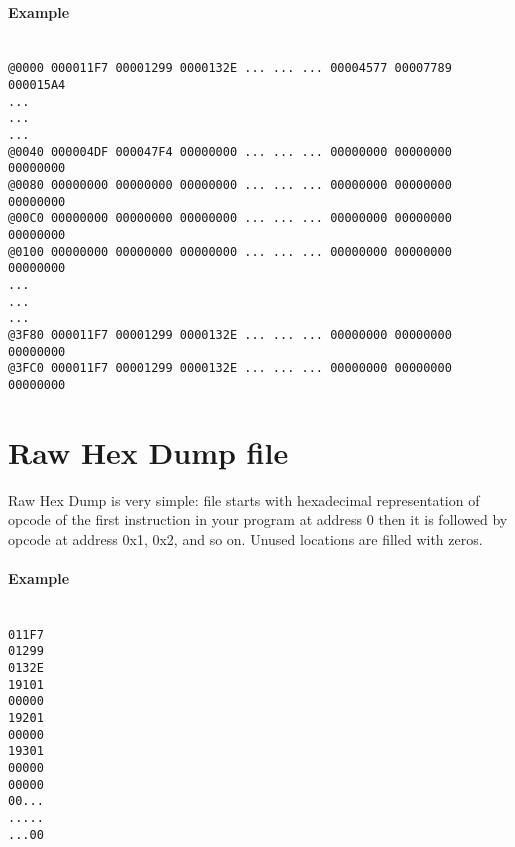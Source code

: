     \paragraph{Example}
        ~\\
        \verb'@0000 000011F7 00001299 0000132E ... ... ... 00004577 00007789 000015A4'\\
        \verb'...'\\
        \verb'...'\\
        \verb'...'\\
        \verb'@0040 000004DF 000047F4 00000000 ... ... ... 00000000 00000000 00000000'\\
        \verb'@0080 00000000 00000000 00000000 ... ... ... 00000000 00000000 00000000'\\
        \verb'@00C0 00000000 00000000 00000000 ... ... ... 00000000 00000000 00000000'\\
        \verb'@0100 00000000 00000000 00000000 ... ... ... 00000000 00000000 00000000'\\
        \verb'...'\\
        \verb'...'\\
        \verb'...'\\
        \verb'@3F80 000011F7 00001299 0000132E ... ... ... 00000000 00000000 00000000'\\
        \verb'@3FC0 000011F7 00001299 0000132E ... ... ... 00000000 00000000 00000000'\\

\section{Raw Hex Dump file}
    Raw Hex Dump is very simple: file starts with hexadecimal representation of opcode of the first instruction in your program at address 0 then it is followed by opcode at address 0x1, 0x2, and so on. Unused locations are filled with zeros.

    \paragraph{Example}
        ~\\
        \verb'011F7'\\
        \verb'01299'\\
        \verb'0132E'\\
        \verb'19101'\\
        \verb'00000'\\
        \verb'19201'\\
        \verb'00000'\\
        \verb'19301'\\
        \verb'00000'\\
        \verb'00000'\\
        \verb'00...'\\
        \verb'.....'\\
        \verb'...00'\\

